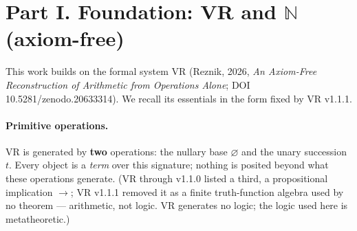\documentclass[11pt]{article}
\theoremstyle{definition}
\newcommand{\zero}{\varnothing}
\newcommand{\F}{\mathsf{F}}
\newcommand{\T}{\top}
\newcommand{\R}{\mathbb{R}}
\newcommand{\C}{\mathbb{C}}
\newcommand{\N}{\mathbb{N}}
\newcommand{\isub}{\ominus}              %
\begin{document}
\begin{abstract}
\textbf{Version note (1.1.2).} Scopes the ``no ontology'' language to \emph{no ontology of substance} (\S VI and the Summary): a wording correction --- VR-Numbers ascribes no \emph{substantial} primitive, yet does carry relational and structural commitments (the membership relation $\in$, the successor-identity of the $t^n(\zero)$), which are \emph{tracked}, not denied; no construction, equivalence, operation, or theorem is altered. It otherwise inherits v1.1.1, which re-synchronised VR-Numbers with the parent work VR \textbf{v1.1.1}, which \emph{removed} the propositional implication $\to$ (and the principles A1, A2 and the $\F$/$\zero$ logical register): VR is now pure arithmetic on two operations $\{\zero, t\}$, generating no logic of its own. Accordingly Part~I is restated for $\{\zero, t\}$, and \textbf{Part~V no longer grounds the two-dimensionality of $\C$ in ``the duality of A1''} --- that grounding rested on the now-removed $\F\to\F$/$\F\to\T$ axes and was an over-claim ($i^2=\isub 1$ is a separate postulate, as \S V.4 notes, so A1 gave a coincidence of count, not a derivation). $\C_{VR}$ is presented as the standard two-component construction over $\R_{VR}$ with $i^2=\isub 1$. \emph{No construction, equivalence, operation, or theorem is altered}; only the A1-grounding narrative is removed. (Earlier sync notes for v1.1.0 and 1.0.2--1.0.3 are superseded here.)
\end{abstract}

\tableofcontents

\section*{Part I. Foundation: VR and $\N$ (axiom-free)}

This work builds on the formal system VR (Reznik, 2026, \emph{An Axiom-Free Reconstruction of
Arithmetic from Operations Alone}; DOI 10.5281/zenodo.20633314). We recall its essentials in the
form fixed by VR v1.1.1.

\paragraph{Primitive operations.} VR is generated by \textbf{two} operations: the nullary base $\zero$ and the
unary succession $t$. Every object is a \emph{term} over this signature; nothing is posited beyond
what these operations generate. (VR through v1.1.0 listed a third, a propositional implication $\to$;
VR v1.1.1 removed it as a finite truth-function algebra used by no theorem --- arithmetic, not logic.
VR generates no logic; the logic used here is metatheoretic.)
\end{document}
